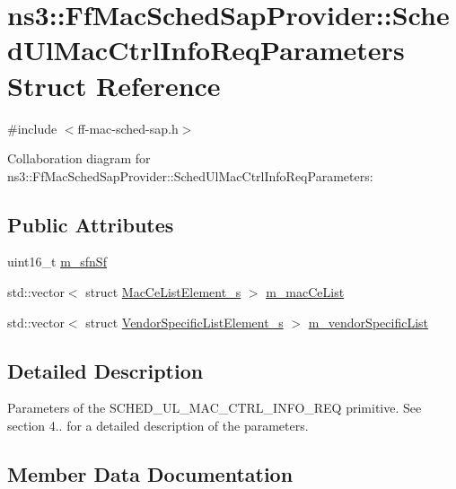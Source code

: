 \hypertarget{structns3_1_1FfMacSchedSapProvider_1_1SchedUlMacCtrlInfoReqParameters}{}\section{ns3\+:\+:Ff\+Mac\+Sched\+Sap\+Provider\+:\+:Sched\+Ul\+Mac\+Ctrl\+Info\+Req\+Parameters Struct Reference}
\label{structns3_1_1FfMacSchedSapProvider_1_1SchedUlMacCtrlInfoReqParameters}


{\ttfamily \#include $<$ff-\/mac-\/sched-\/sap.\+h$>$}



Collaboration diagram for ns3\+:\+:Ff\+Mac\+Sched\+Sap\+Provider\+:\+:Sched\+Ul\+Mac\+Ctrl\+Info\+Req\+Parameters\+:
\subsection*{Public Attributes}
\begin{DoxyCompactItemize}
\item 
uint16\+\_\+t \hyperlink{structns3_1_1FfMacSchedSapProvider_1_1SchedUlMacCtrlInfoReqParameters_a89dd0c663b8e031e46e849680a5bef55}{m\+\_\+sfn\+Sf}
\item 
std\+::vector$<$ struct \hyperlink{structns3_1_1MacCeListElement__s}{Mac\+Ce\+List\+Element\+\_\+s} $>$ \hyperlink{structns3_1_1FfMacSchedSapProvider_1_1SchedUlMacCtrlInfoReqParameters_aeb2a3532424914d92b3c31b08b297149}{m\+\_\+mac\+Ce\+List}
\item 
std\+::vector$<$ struct \hyperlink{structns3_1_1VendorSpecificListElement__s}{Vendor\+Specific\+List\+Element\+\_\+s} $>$ \hyperlink{structns3_1_1FfMacSchedSapProvider_1_1SchedUlMacCtrlInfoReqParameters_a9f583d496dc2ef0a4eb805d55233fc7e}{m\+\_\+vendor\+Specific\+List}
\end{DoxyCompactItemize}


\subsection{Detailed Description}
Parameters of the S\+C\+H\+E\+D\+\_\+\+U\+L\+\_\+\+M\+A\+C\+\_\+\+C\+T\+R\+L\+\_\+\+I\+N\+F\+O\+\_\+\+R\+EQ primitive. See section 4.. for a detailed description of the parameters. 

\subsection{Member Data Documentation}
